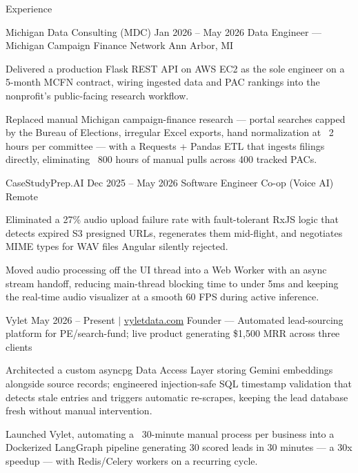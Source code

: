 \documentclass[
	11pt
]{../../../template}
\begin{document}
	\begin{rSection}{E}{xperience}
		\begin{rSectionEntry}
			{Michigan Data Consulting (MDC)}
			{Jan 2026 -- May 2026}
			{Data Engineer --- Michigan Campaign Finance Network}
			{}
			{Ann Arbor, MI}

			\item Delivered a production Flask REST API on AWS EC2 as the sole engineer on a 5-month MCFN contract, wiring ingested data and PAC rankings into the nonprofit's public-facing research workflow.
			\item Replaced manual Michigan campaign-finance research --- portal searches capped by the Bureau of Elections, irregular Excel exports, hand normalization at ~2 hours per committee --- with a Requests + Pandas ETL that ingests filings directly, eliminating ~800 hours of manual pulls across 400 tracked PACs.
		\end{rSectionEntry}

		\begin{rSectionEntry}
			{CaseStudyPrep.AI}
			{Dec 2025 -- May 2026}
			{Software Engineer Co-op (Voice AI)}
			{}
			{Remote}

			\item Eliminated a 27\% audio upload failure rate with fault-tolerant RxJS logic that detects expired S3 presigned URLs, regenerates them mid-flight, and negotiates MIME types for WAV files Angular silently rejected.
			\item Moved audio processing off the UI thread into a Web Worker with an async stream handoff, reducing main-thread blocking time to under 5ms and keeping the real-time audio visualizer at a smooth 60 FPS during active inference.
		\end{rSectionEntry}

		\begin{rSectionEntry}
			{Vylet}
			{May 2026 -- Present $\vert$ \href{https://vyletdata.com}{vyletdata.com}}
			{Founder --- Automated lead-sourcing platform for PE/search-fund; live product generating \$1,500 MRR across three clients}
			{}
			{}

			\item Architected a custom asyncpg Data Access Layer storing Gemini embeddings alongside source records; engineered injection-safe SQL timestamp validation that detects stale entries and triggers automatic re-scrapes, keeping the lead database fresh without manual intervention.
			\item Launched Vylet, automating a ~30-minute manual process per business into a Dockerized LangGraph pipeline generating 30 scored leads in 30 minutes --- a 30x speedup --- with Redis/Celery workers on a recurring cycle.
		\end{rSectionEntry}


\end{rSection}
\end{document}
